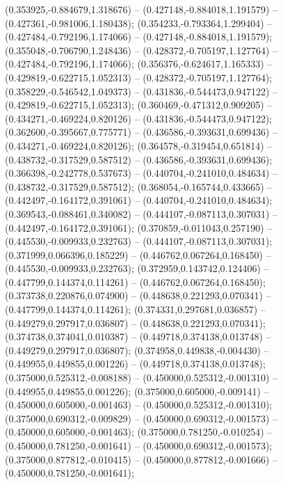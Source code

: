  (0.353925,-0.884679,1.318676) -- (0.427148,-0.884018,1.191579) -- (0.427361,-0.981006,1.180438);
 (0.354233,-0.793364,1.299404) -- (0.427484,-0.792196,1.174066) -- (0.427148,-0.884018,1.191579);
 (0.355048,-0.706790,1.248436) -- (0.428372,-0.705197,1.127764) -- (0.427484,-0.792196,1.174066);
 (0.356376,-0.624617,1.165333) -- (0.429819,-0.622715,1.052313) -- (0.428372,-0.705197,1.127764);
 (0.358229,-0.546542,1.049373) -- (0.431836,-0.544473,0.947122) -- (0.429819,-0.622715,1.052313);
 (0.360469,-0.471312,0.909205) -- (0.434271,-0.469224,0.820126) -- (0.431836,-0.544473,0.947122);
 (0.362600,-0.395667,0.775771) -- (0.436586,-0.393631,0.699436) -- (0.434271,-0.469224,0.820126);
 (0.364578,-0.319454,0.651814) -- (0.438732,-0.317529,0.587512) -- (0.436586,-0.393631,0.699436);
 (0.366398,-0.242778,0.537673) -- (0.440704,-0.241010,0.484634) -- (0.438732,-0.317529,0.587512);
 (0.368054,-0.165744,0.433665) -- (0.442497,-0.164172,0.391061) -- (0.440704,-0.241010,0.484634);
 (0.369543,-0.088461,0.340082) -- (0.444107,-0.087113,0.307031) -- (0.442497,-0.164172,0.391061);
 (0.370859,-0.011043,0.257190) -- (0.445530,-0.009933,0.232763) -- (0.444107,-0.087113,0.307031);
 (0.371999,0.066396,0.185229) -- (0.446762,0.067264,0.168450) -- (0.445530,-0.009933,0.232763);
 (0.372959,0.143742,0.124406) -- (0.447799,0.144374,0.114261) -- (0.446762,0.067264,0.168450);
 (0.373738,0.220876,0.074900) -- (0.448638,0.221293,0.070341) -- (0.447799,0.144374,0.114261);
 (0.374331,0.297681,0.036857) -- (0.449279,0.297917,0.036807) -- (0.448638,0.221293,0.070341);
 (0.374738,0.374041,0.010387) -- (0.449718,0.374138,0.013748) -- (0.449279,0.297917,0.036807);
 (0.374958,0.449838,-0.004430) -- (0.449955,0.449855,0.001226) -- (0.449718,0.374138,0.013748);
 (0.375000,0.525312,-0.008188) -- (0.450000,0.525312,-0.001310) -- (0.449955,0.449855,0.001226);
 (0.375000,0.605000,-0.009141) -- (0.450000,0.605000,-0.001463) -- (0.450000,0.525312,-0.001310);
 (0.375000,0.690312,-0.009829) -- (0.450000,0.690312,-0.001573) -- (0.450000,0.605000,-0.001463);
 (0.375000,0.781250,-0.010254) -- (0.450000,0.781250,-0.001641) -- (0.450000,0.690312,-0.001573);
 (0.375000,0.877812,-0.010415) -- (0.450000,0.877812,-0.001666) -- (0.450000,0.781250,-0.001641);

